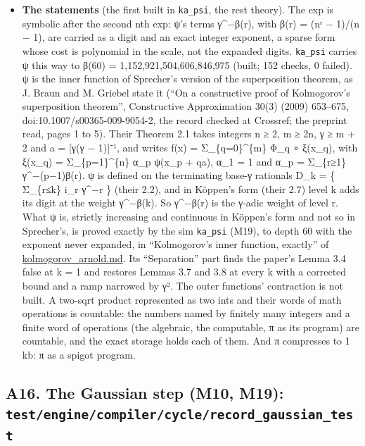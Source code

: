 \begin{itemize}
\item \textbf{The statements} (the first built in \texttt{ka\_\allowbreak{}psi}, the rest theory). The exp is symbolic after the second nth exp: ψ's terms γ\textasciicircum{}−β(r), with β(r) = (nʳ − 1)/(n − 1), are carried as a digit and an exact integer exponent, a sparse form whose cost is polynomial in the scale, not the expanded digits. \texttt{ka\_\allowbreak{}psi} carries ψ this way to β(60) = 1,152,921,504,606,846,975 (built; 152 checks, 0 failed). ψ is the inner function of Sprecher's version of the superposition theorem, as J. Braun and M. Griebel state it (“On a constructive proof of Kolmogorov's superposition theorem”, Constructive Approximation 30(3) (2009) 653–675, doi:10.1007/s00365-009-9054-2, the record checked at Crossref; the preprint read, pages 1 to 5). Their Theorem 2.1 takes integers n ≥ 2, m ≥ 2n, γ ≥ m + 2 and a = [γ(γ − 1)]⁻¹, and writes f(x) = Σ\_\allowbreak{}\{q=0\}\textasciicircum{}\{m\} Φ\_\allowbreak{}q ∘ ξ(x\_\allowbreak{}q), with ξ(x\_\allowbreak{}q) = Σ\_\allowbreak{}\{p=1\}\textasciicircum{}\{n\} α\_\allowbreak{}p ψ(x\_\allowbreak{}p + qa), α\_\allowbreak{}1 = 1 and α\_\allowbreak{}p = Σ\_\allowbreak{}\{r≥1\} γ\textasciicircum{}−(p−1)β(r). ψ is defined on the terminating base-γ rationals D\_\allowbreak{}k = \{ Σ\_\allowbreak{}\{r≤k\} i\_\allowbreak{}r γ\textasciicircum{}−r \} (their 2.2), and in Köppen's form (their 2.7) level k adds its digit at the weight γ\textasciicircum{}−β(k). So γ\textasciicircum{}−β(r) is the γ-adic weight of level r. What ψ is, strictly increasing and continuous in Köppen's form and not so in Sprecher's, is proved exactly by the sim \texttt{ka\_\allowbreak{}psi} (M19), to depth 60 with the exponent never expanded, in “Kolmogorov's inner function, exactly” of \hyperref[chap:kolmogorov-arnold]{kolmogorov\_\allowbreak{}arnold.md}. Its “Separation” part finds the paper's Lemma 3.4 false at k = 1 and restores Lemmas 3.7 and 3.8 at every k with a corrected bound and a ramp narrowed by γ². The outer functions' contraction is not built. A two-sqrt product represented as two ints and their words of math operations is countable: the numbers named by finitely many integers and a finite word of operations (the algebraic, the computable, π as its program) are countable, and the exact storage holds each of them. And π compresses to 1 kb: π as a spigot program.
\end{itemize}

\subsection{\texorpdfstring{A16. The Gaussian step (M10, M19): \texttt{test/\allowbreak{}engine/\allowbreak{}compiler/\allowbreak{}cycle/\allowbreak{}record\_\allowbreak{}gaussian\_\allowbreak{}test}}{A16. The Gaussian step (M10, M19): test/engine/compiler/cycle/record\_gaussian\_test}}

